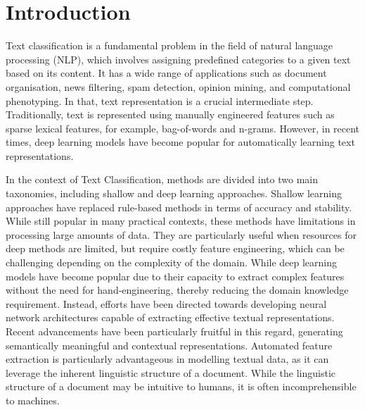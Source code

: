 \section{Introduction}
Text classification is a fundamental problem in the field of natural language processing (NLP), which involves assigning predefined categories to a given text based on its content. It has a wide range of applications such as document organisation, news filtering, spam detection, opinion mining, and computational phenotyping.  In that, text representation is a crucial intermediate step. Traditionally, text is represented using manually engineered features such as sparse lexical features, for example, bag-of-words and n-grams. However, in recent times, deep learning models have become popular for automatically learning text representations. 

In the context of Text Classification, methods are divided into two main taxonomies, including shallow and deep learning approaches. Shallow learning approaches have replaced rule-based methods in terms of accuracy and stability. While still popular in many practical contexts, these methods have limitations in processing large amounts of data. They are particularly useful when resources for deep methods are limited, but require costly feature engineering, which can be challenging depending on the complexity of the domain. While deep learning models have become popular due to their capacity to extract complex features without the need for hand-engineering, thereby reducing the domain knowledge requirement. Instead, efforts have been directed towards developing neural network architectures capable of extracting effective textual representations. Recent advancements have been particularly fruitful in this regard, generating semantically meaningful and contextual representations. Automated feature extraction is particularly advantageous in modelling textual data, as it can leverage the inherent linguistic structure of a document. While the linguistic structure of a document may be intuitive to humans, it is often incomprehensible to machines.

